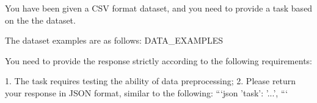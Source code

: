 \begin{tcolorbox}[colback=cadmiumgreen!5!white,colframe=forestgreen!75!white,breakable,title=\textit{Prompt for task construction in data preprocessing.}]
\begin{VerbatimWrap}
You have been given a CSV format dataset, and you need to provide a task based on the the dataset.

The dataset examples are as follows:
{{DATA_EXAMPLES}}

You need to provide the response strictly according to the following requirements:

1. The task requires testing the ability of data preprocessing;
2. Please return your response in JSON format, similar to the following:
```json
{
    'task': '...',
}
```
\end{VerbatimWrap}
\end{tcolorbox}

